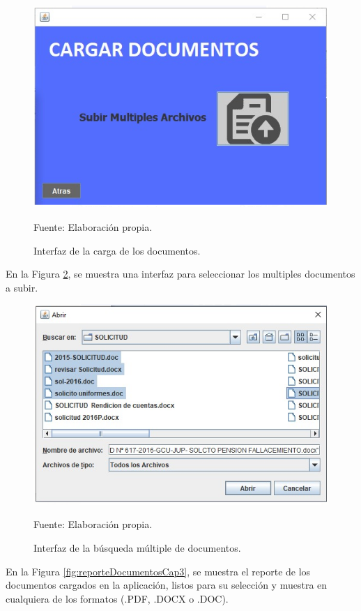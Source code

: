 \begin{figure}[h!]
	\centering
		\includegraphics[scale=0.7]{imagenes/CargaDocumentosss.png}
		\caption{Interfaz de la carga de los documentos.}
		\begin{center}
    Fuente: Elaboración propia.
    \end{center}
	\label{fig:CargaDocumentossCap3}
\end{figure}

En la Figura \ref{fig:CargamultipleDocCap3}, se muestra una interfaz para seleccionar los multiples documentos a subir.
\begin{figure}[h!]
	\centering
		\includegraphics[scale=0.5]{imagenes/CargamultipleDoc.png}
		\caption{Interfaz de la búsqueda múltiple de documentos.}
		\begin{center}
    Fuente: Elaboración propia.
    \end{center}
	\label{fig:CargamultipleDocCap3}
\end{figure}
\newpage
En la Figura \ref{fig:reporteDocumentosCap3}, se muestra el reporte de los documentos cargados en la aplicación, listos para su selección y muestra en cualquiera de los formatos (.PDF, .DOCX o .DOC).

